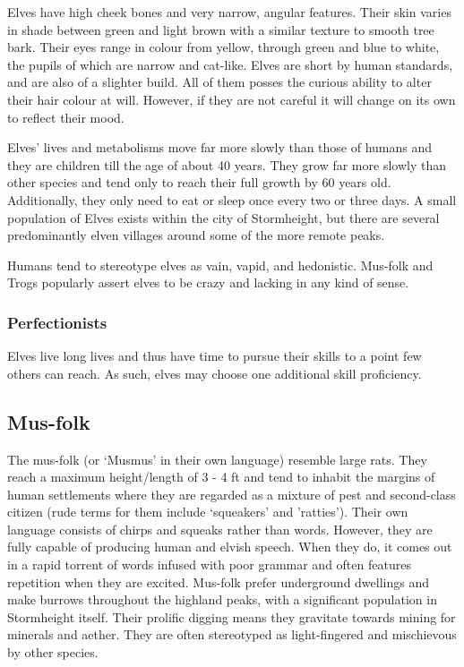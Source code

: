 \documentclass[a4paper,11pt,oneside]{book}
\begin{document}
Elves have high cheek bones and very narrow, angular features. Their skin varies in shade between green and light brown with a similar texture to smooth tree bark. Their eyes range in colour from yellow, through green and blue to white, the pupils of which are narrow and cat-like. Elves are short by human standards, and are also of a slighter build. All of them posses the curious ability to alter their hair colour at will. However, if they are not careful it will change on its own to reflect their mood. 

Elves' lives and metabolisms move far more slowly than those of humans and they are children till the age of about 40 years. They grow far more slowly than other species and tend only to reach their full growth by 60 years old. Additionally, they only need to eat or sleep once every two or three days. A small population of Elves exists within the city of Stormheight, but there are several predominantly elven villages around some of the more remote peaks. 

Humans tend to stereotype elves as vain, vapid, and hedonistic. Mus-folk and Trogs popularly assert elves to be crazy and lacking in any kind of sense. 

\subsubsection*{Perfectionists}
Elves live long lives and thus have time to pursue their skills to a point few others can reach. As such, elves may choose one additional skill proficiency.


\subsection{Mus-folk}
The mus-folk (or `Musmus' in their own language) resemble large rats. They reach a maximum height/length of 3 - 4 ft and tend to inhabit the margins of human settlements where they are regarded as a mixture of pest and second-class citizen (rude terms for them include `squeakers' and 'ratties'). Their own language consists of chirps and squeaks rather than words. However, they are fully capable of producing human and elvish speech. When they do, it comes out in a rapid torrent of words infused with poor grammar and often features repetition when they are excited. Mus-folk prefer underground dwellings and make burrows throughout the highland peaks, with a significant population in Stormheight itself. Their prolific digging means they gravitate towards mining for minerals and aether. They are often stereotyped as light-fingered and mischievous by other species.  
\end{document}

